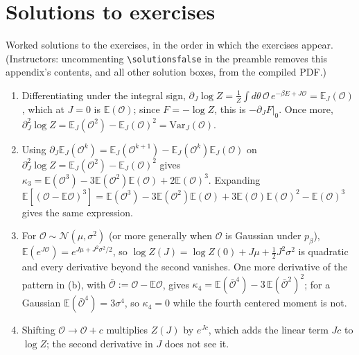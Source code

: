 \documentclass[11pt]{article}
\newcommand{\E}{\mathbb{E}}
\newcommand{\CN}{{\mathcal N}}
\newcommand{\CO}{{\mathcal O}}
\newcommand{\pd}{\partial}
\begin{document}
\section{Solutions to exercises}
\label{app:solutions}

Worked solutions to the exercises, in the order in which the exercises appear. (Instructors: uncommenting \verb|\solutionsfalse| in the preamble removes this appendix's contents, and all other solution boxes, from the compiled PDF.)

\begin{solution}[ex:cumulants]
\begin{enumerate}
    \item Differentiating under the integral sign, $\pd_J\log Z = \frac{1}{Z}\int d\theta\,\CO\,e^{-\beta E+J\CO} = \E_J(\CO)$, which at $J=0$ is $\E(\CO)$; since $F=-\log Z$, this is $-\pd_JF|_0$. Once more, $\pd_J^2\log Z = \E_J(\CO^2)-\E_J(\CO)^2 = \mathrm{Var}_J(\CO)$.
    \item Using $\pd_J\E_J(\CO^k) = \E_J(\CO^{k+1}) - \E_J(\CO^k)\E_J(\CO)$ on $\pd_J^2\log Z = \E_J(\CO^2)-\E_J(\CO)^2$ gives
    $\kappa_3 = \E(\CO^3) - 3\E(\CO^2)\E(\CO) + 2\E(\CO)^3$. Expanding $\E[(\CO-\E\CO)^3] = \E(\CO^3) - 3\E(\CO^2)\E(\CO) + 3\E(\CO)\E(\CO)^2 - \E(\CO)^3$ gives the same expression.
    \item For $\CO\sim\CN(\mu,\sigma^2)$ (or more generally when $\CO$ is Gaussian under $p_\beta$), $\E(e^{J\CO}) = e^{J\mu+J^2\sigma^2/2}$, so $\log Z(J) = \log Z(0) + J\mu + \frac{1}{2}J^2\sigma^2$ is quadratic and every derivative beyond the second vanishes. One more derivative of the pattern in (b), with $\bar\CO := \CO - \E\CO$, gives $\kappa_4 = \E(\bar\CO^4) - 3\,\E(\bar\CO^2)^2$; for a Gaussian $\E(\bar\CO^4) = 3\sigma^4$, so $\kappa_4 = 0$ while the fourth centered moment is not.
    \item Shifting $\CO \to \CO + c$ multiplies $Z(J)$ by $e^{Jc}$, which adds the linear term $Jc$ to $\log Z$; the second derivative in $J$ does not see it.
\end{enumerate}
\end{solution}
\end{document}
